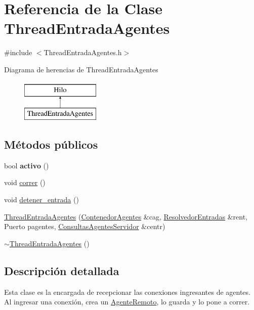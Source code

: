 \hypertarget{classThreadEntradaAgentes}{\section{\-Referencia de la \-Clase \-Thread\-Entrada\-Agentes}
\label{classThreadEntradaAgentes}
}


{\ttfamily \#include $<$\-Thread\-Entrada\-Agentes.\-h$>$}

\-Diagrama de herencias de \-Thread\-Entrada\-Agentes\begin{figure}[H]
\begin{center}
\leavevmode
\includegraphics[height=2.000000cm]{classThreadEntradaAgentes}
\end{center}
\end{figure}
\subsection*{\-Métodos públicos}
\begin{DoxyCompactItemize}
\item 
\hypertarget{classThreadEntradaAgentes_a7026233eb4d88a5262fa5ede40e49d0c}{bool {\bfseries activo} ()}\label{classThreadEntradaAgentes_a7026233eb4d88a5262fa5ede40e49d0c}

\item 
void \hyperlink{classThreadEntradaAgentes_ae7ae2e0706d4daf52a368523e39216e6}{correr} ()
\item 
void \hyperlink{classThreadEntradaAgentes_a3d6baf4fb4e1ac666d3404d6544c32c1}{detener\-\_\-entrada} ()
\item 
\hyperlink{classThreadEntradaAgentes_aeb43331665e5a96221fa1382435ba49c}{\-Thread\-Entrada\-Agentes} (\hyperlink{classContenedorAgentes}{\-Contenedor\-Agentes} \&cag, \hyperlink{classResolvedorEntradas}{\-Resolvedor\-Entradas} \&rent, \-Puerto pagentes, \hyperlink{classBLQueue}{\-Consultas\-Agentes\-Servidor} \&centr)
\item 
\hyperlink{classThreadEntradaAgentes_a52b3a7406301678c2495bb87d690ef19}{$\sim$\-Thread\-Entrada\-Agentes} ()
\end{DoxyCompactItemize}


\subsection{\-Descripción detallada}
\-Esta clase es la encargada de recepcionar las conexiones ingresantes de agentes. \-Al ingresar una conexión, crea un \hyperlink{classAgenteRemoto}{\-Agente\-Remoto}, lo guarda y lo pone a correr. 

